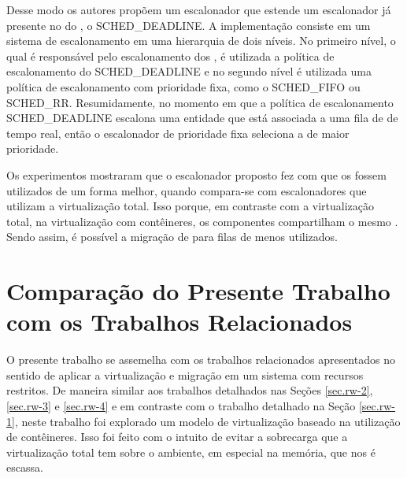 Desse modo os autores propõem um escalonador que estende um escalonador já presente no  do \linux, o SCHED\_DEADLINE. A implementação consiste em um sistema de escalonamento em uma hierarquia de dois níveis. No primeiro nível, o qual é responsável pelo escalonamento dos \cgroups, é utilizada a política de escalonamento do SCHED\_DEADLINE e no segundo nível é utilizada uma política de escalonamento com prioridade fixa, como o SCHED\_FIFO ou SCHED\_RR.
Resumidamente, no momento em que a política de escalonamento SCHED\_DEADLINE escalona uma entidade que está associada a uma fila de \tasks de tempo real, então o escalonador de prioridade fixa seleciona a \task de maior prioridade.

Os experimentos mostraram que o escalonador proposto fez com que os \cores fossem utilizados de um forma melhor, quando compara-se com escalonadores que utilizam a virtualização total. Isso porque, em contraste com a virtualização total, na virtualização com contêineres, os componentes compartilham o mesmo . Sendo assim, é possível a migração de \tasks para filas de \cores menos utilizados.

\section{Comparação do Presente Trabalho com os Trabalhos Relacionados}

O presente trabalho se assemelha com os trabalhos relacionados apresentados no sentido de aplicar a virtualização e migração em um sistema com recursos restritos. De maneira similar aos trabalhos detalhados nas Seções \ref{sec.rw-2}, \ref{sec.rw-3} e \ref{sec.rw-4} e em contraste com o trabalho detalhado na Seção \ref{sec.rw-1}, neste trabalho foi explorado um modelo de virtualização baseado na utilização de contêineres. Isso foi feito com o intuito de evitar a sobrecarga que a virtualização total tem sobre o ambiente, em especial na memória, que nos \lws é escassa.

